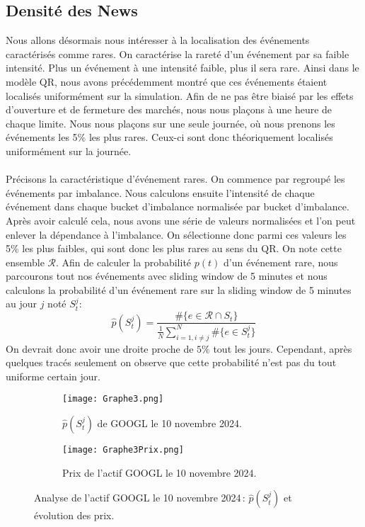 \documentclass[12pt,a4paper]{article}
\theoremstyle{definition}
\theoremstyle{remark}
\begin{document}
\subsection{Densité des News}
Nous allons désormais nous intéresser à la localisation des événements caractérisés comme rares. On caractérise la rareté d'un événement par sa faible intensité. Plus un événement à une intensité faible, plus il sera rare. Ainsi dans le modèle QR, nous avons précédemment montré que ces événements étaient localisés uniformément sur la simulation. Afin de ne pas être biaisé par les effets d'ouverture et de fermeture des marchés, nous nous plaçons à une heure de chaque limite. Nous nous plaçons sur une seule journée, où nous prenons les événements les 5\% les plus rares. Ceux-ci sont donc théoriquement localisés uniformément sur la journée.
\\
\\
Précisons la caractéristique d'événement rares. On commence par regroupé les événements par imbalance. Nous calculons ensuite l'intensité de chaque événement dans chaque bucket d'imbalance normalisée par bucket d'imbalance. Après avoir calculé cela, 
nous avons une série de valeurs normalisées et l'on peut enlever la dépendance à l'imbalance. On sélectionne donc parmi ces valeurs les 5\% les plus faibles, qui sont donc les plus rares au sens du QR. On note cette ensemble $\mathcal{R}$. Afin de calculer la probabilité $p(t)$ d'un événement rare, nous parcourons tout nos événements avec sliding window de 5 minutes et nous calculons la probabilité d'un événement rare sur la sliding window de 5 minutes au jour $j$ noté $S_t^j$:
$$\hat{p}(S_t^j) = \frac{\#\{e\in \mathcal{R}\cap S_t\}}{\frac{1}{N}\sum_{i=1,i\neq j}^N\#\{e\in S_t^j\}}$$
On devrait donc avoir une droite proche de $5\%$ tout les jours. Cependant, après quelques tracés seulement on observe que cette probabilité n'est pas du tout uniforme certain jour.
\begin{figure}[h!]
    \centering
    \begin{subfigure}[b]{0.48\textwidth}
        \centering
        \texttt{[image: Graphe3.png]}
        \caption{$\hat{p}(S_t^j)$ de GOOGL le 10 novembre 2024.}
        \label{fig:graphe3}
    \end{subfigure}
    \hfill
    \begin{subfigure}[b]{0.48\textwidth}
        \centering
        \texttt{[image: Graphe3Prix.png]}
        \caption{Prix de l'actif GOOGL le 10 novembre 2024.}
        \label{fig:graphe3Prix}
    \end{subfigure}

    \caption{Analyse de l'actif GOOGL le 10 novembre 2024 : $\hat{p}(S_t^j)$ et évolution des prix.}
    \label{fig:comparison}
\end{figure}
\end{document}
